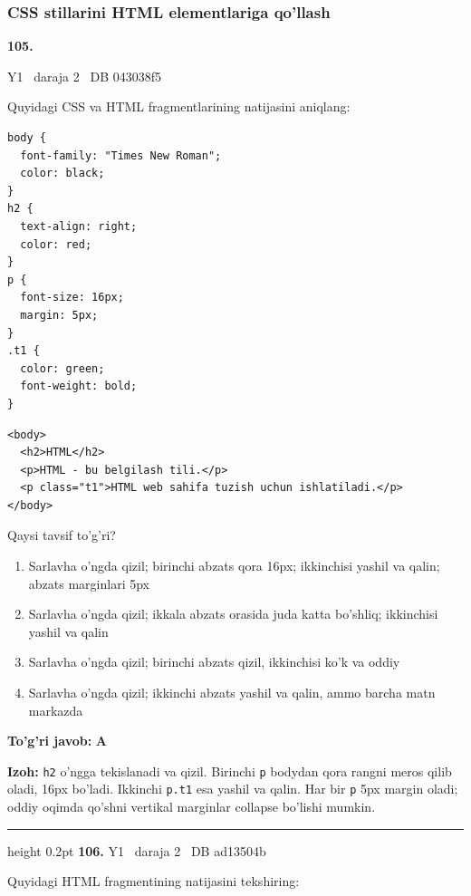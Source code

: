 \documentclass[10pt,a4paper,oneside]{article}
\begin{document}
\subsubsection{CSS stillarini HTML elementlariga qo'llash}
\hypertarget{q105}{\textbf{\color{ink}105.}}  {\color{muted}\scriptsize Y1 \textbullet\ daraja 2 \textbullet\ DB 043038f5}
\par
Quyidagi CSS va HTML fragmentlarining natijasini aniqlang:

\par
\begin{lstlisting}
body {
  font-family: "Times New Roman";
  color: black;
}
h2 {
  text-align: right;
  color: red;
}
p {
  font-size: 16px;
  margin: 5px;
}
.t1 {
  color: green;
  font-weight: bold;
}
\end{lstlisting}


\par
\begin{lstlisting}
<body>
  <h2>HTML</h2>
  <p>HTML - bu belgilash tili.</p>
  <p class="t1">HTML web sahifa tuzish uchun ishlatiladi.</p>
</body>
\end{lstlisting}


\par
Qaysi tavsif to'g'ri?
\begin{enumerate}[label=\Alph*),leftmargin=9mm]
\item Sarlavha o'ngda qizil; birinchi abzats qora 16px; ikkinchisi yashil va qalin; abzats marginlari 5px
\item Sarlavha o'ngda qizil; ikkala abzats orasida juda katta bo'shliq; ikkinchisi yashil va qalin
\item Sarlavha o'ngda qizil; birinchi abzats qizil, ikkinchisi ko'k va oddiy
\item Sarlavha o'ngda qizil; ikkinchi abzats yashil va qalin, ammo barcha matn markazda
\end{enumerate}
\begin{tcolorbox}[enhanced,breakable,colback=teal!4,colframe=teal!45!black,boxrule=0.45pt,arc=1.2mm,left=2.8mm,right=2.8mm,top=2mm,bottom=2mm,before skip=2mm,after skip=2mm]
\textbf{\color{teal}To'g'ri javob:} \textbf{A}
\par\smallskip
\textbf{Izoh:} \texttt{h2} o'ngga tekislanadi va qizil. Birinchi \texttt{p} bodydan qora rangni meros qilib oladi, 16px bo'ladi. Ikkinchi \texttt{p.t1} esa yashil va qalin. Har bir \texttt{p} 5px margin oladi; oddiy oqimda qo'shni vertikal marginlar collapse bo'lishi mumkin.
\end{tcolorbox}
\vspace{2mm}\hrule height 0.2pt \vspace{4mm}
\hypertarget{q106}{\textbf{\color{ink}106.}}  {\color{muted}\scriptsize Y1 \textbullet\ daraja 2 \textbullet\ DB ad13504b}
\par
Quyidagi HTML fragmentining natijasini tekshiring:
\end{document}
